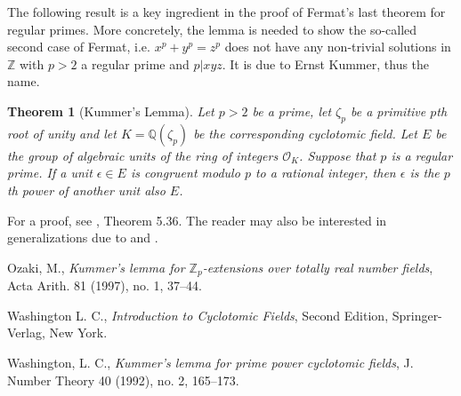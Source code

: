 \documentclass[12pt]{article}
\newtheorem*{thm}{Theorem}
\theoremstyle{definition}
\newcommand{\Ints}{\mathbb{Z}}
\newcommand{\Rats}{\mathbb{Q}}
\begin{document}
The following result is a key ingredient in the proof of Fermat's last theorem for regular primes. More concretely, the lemma is needed to show the so-called second case of Fermat, i.e. $x^p+y^p=z^p$ does not have any non-trivial solutions in $\Ints$ with $p>2$ a regular prime and $p|xyz$. It is due to Ernst Kummer, thus the name.

\begin{thm}[Kummer's Lemma]
Let $p>2$ be a prime, let $\zeta_p$ be a primitive $p$th root of unity and let $K=\Rats(\zeta_p)$ be the corresponding cyclotomic field. Let $E$ be the group of algebraic units of the ring of integers $\mathcal{O}_K$. Suppose that $p$ is a regular prime. If a unit $\epsilon\in E$ is congruent modulo $p$ to a rational integer, then $\epsilon$ is the $p$th power of another unit also $E$.
\end{thm}

For a proof, see \cite{wash}, Theorem 5.36. The reader may also be interested in generalizations due to \cite{wash2} and \cite{ozaki}.

\begin{thebibliography}{Washington 1992}
 Ozaki, M., {\em Kummer's lemma for $\Ints_p$-extensions over totally real number fields},  Acta Arith.  81  (1997),  no. 1, 37--44.

 Washington L. C., {\em Introduction to Cyclotomic
Fields}, Second Edition, Springer-Verlag, New York.

 Washington, L. C., {\em Kummer's lemma for prime power cyclotomic fields},  J. Number Theory  40  (1992),  no. 2, 165--173.
\end{thebibliography}
\end{document}
